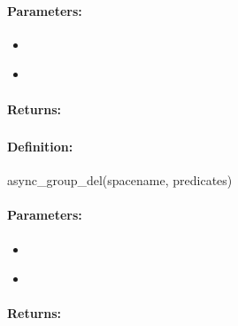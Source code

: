 \paragraph{Parameters:}
\begin{itemize}[noitemsep]
\item {}\\

\item {}\\

\end{itemize}

\paragraph{Returns:}


\pagebreak
\subsubsection{}
\label{api:ruby:async_group_del}


\paragraph{Definition:}
\begin{rubycode}
async_group_del(spacename, predicates)
\end{rubycode}

\paragraph{Parameters:}
\begin{itemize}[noitemsep]
\item {}\\

\item {}\\

\end{itemize}

\paragraph{Returns:}


